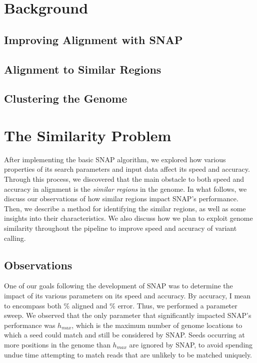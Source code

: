 \documentclass[twocolumn,10pt]{article}
\begin{document}
\section{Background}

\subsection{Improving Alignment with SNAP}
\label{section:SNAP}

\subsection{Alignment to Similar Regions}

\subsection{Clustering the Genome}
\label{section:clusteringTheGenome}

\section{The Similarity Problem}
\label{section:similarityProblem}

After implementing the basic SNAP algorithm, we explored how various properties of its search parameters and input data affect its speed and accuracy.  Through this process, we discovered that the main obstacle to both speed and accuracy in alignment is the \textit{similar regions} in the genome.  In what follows, we discuss our observations of how similar regions impact SNAP's performance.  Then, we describe a method for identifying the similar regions, as well as some insights into their characteristics.  We also discuss how we plan to exploit genome similarity throughout the pipeline to improve speed and accuracy of variant calling.

\subsection{Observations}

One of our goals following the development of SNAP was to determine the impact of its various parameters on its speed and accuracy.  By accuracy, I mean to encompass both \% aligned and \% error.  Thus, we performed a parameter sweep.  We observed that the only parameter that significantly impacted SNAP's performance was \(h_{max}\), which is the maximum number of genome locations to which a seed could match and still be considered by SNAP.  Seeds occurring at more positions in the genome than \(h_{max}\) are ignored by SNAP, to avoid spending undue time attempting to match reads that are unlikely to be matched uniquely.
\end{document}
